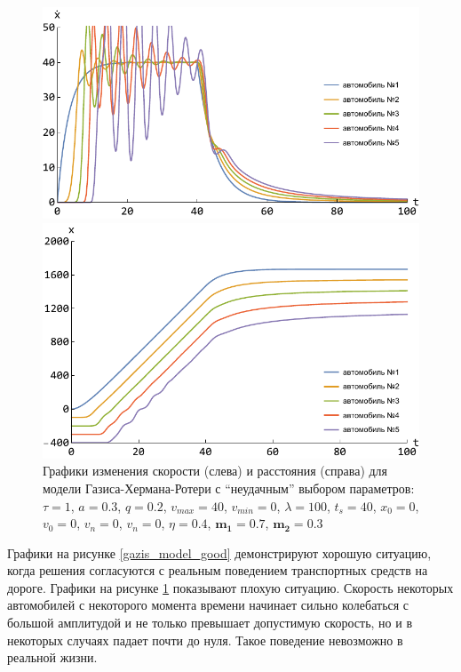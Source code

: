 \documentclass[12pt, a4paper]{extarticle}
\numberwithin{equation}{section}
\numberwithin{figure}{section}
\begin{document}
\begin{figure}[h!]
	\begin{center}
		\begin{minipage}[h!]{0.48\linewidth}
			\includegraphics[width=1\linewidth,height=0.2\textheight]
			{Images/gazis_model_bad_speed.pdf}
		\end{minipage}
		\hfill 
		\begin{minipage}[h!]{0.48\linewidth}
			\includegraphics[width=1\linewidth,height=0.2\textheight]
			{Images/gazis_model_bad_distance.pdf}
		\end{minipage}
		\caption{Графики изменения скорости (слева) и расстояния (справа) для модели Газиса-Хермана-Ротери с ``неудачным'' выбором параметров: $\tau=1$, $a=0.3$, $q=0.2$, $v_{max}=40$, $v_{min}=0$, $\lambda=100$, $t_s=40$, $x_0=0$, $v_0=0$, $v_n=0$, $v_n=0$, $\eta=0.4$, $\boldsymbol{m_1=0.7}$, $\boldsymbol{m_2=0.3}$}
		\label{gazis_model_bad}
	\end{center}
\end{figure}

Графики на рисунке \ref{gazis_model_good} демонстрируют хорошую ситуацию, когда решения согласуются с реальным поведением транспортных средств на дороге. Графики на рисунке \ref{gazis_model_bad} показывают плохую ситуацию. Скорость некоторых автомобилей с некоторого момента времени начинает сильно колебаться с большой амплитудой и не только превышает допустимую скорость, но и в некоторых случаях падает почти до нуля. Такое поведение невозможно в реальной жизни.
\end{document}
